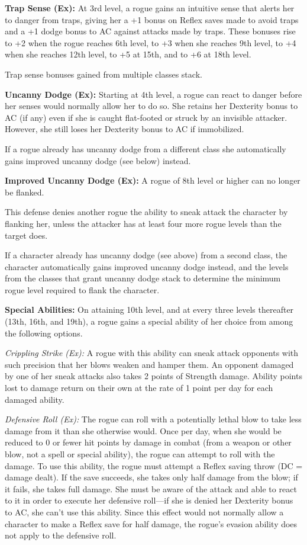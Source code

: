 \documentclass{article}
\begin{document}
\textbf{Trap Sense (Ex):} At 3rd level, a rogue gains an intuitive sense that alerts 
her to danger from traps, giving her a +1 bonus on Reflex saves made to avoid traps 
and a +1 dodge bonus to AC against attacks made by traps. These bonuses rise to 
+2 when the rogue reaches 6th level, to +3 when she reaches 9th level, to +4 when 
she reaches 12th level, to +5 at 15th, and to +6 at 18th level.

Trap sense bonuses gained from multiple classes stack.

\textbf{Uncanny Dodge (Ex):} Starting at 4th level, a rogue can react to danger 
before her senses would normally allow her to do so. She retains her Dexterity 
bonus to AC (if any) even if she is caught flat-footed or struck by an invisible 
attacker. However, she still loses her Dexterity bonus to AC if immobilized.

If a rogue already has uncanny dodge from a different class she automatically gains 
improved uncanny dodge (see below) instead.

\textbf{Improved Uncanny Dodge (Ex):} A rogue of 8th level or higher can no longer 
be flanked.

This defense denies another rogue the ability to sneak attack the character by 
flanking her, unless the attacker has at least four more rogue levels than the 
target does.

If a character already has uncanny dodge (see above) from a second class, the character 
automatically gains improved uncanny dodge instead, and the levels from the classes 
that grant uncanny dodge stack to determine the minimum rogue level required to 
flank the character.

\textbf{Special Abilities:} On attaining 10th level, and at every three levels 
thereafter (13th, 16th, and 19th), a rogue gains a special ability of her choice 
from among the following options.

\textit{Crippling Strike (Ex): }A rogue with this ability can sneak attack opponents 
with such precision that her blows weaken and hamper them. An opponent damaged 
by one of her sneak attacks also takes 2 points of Strength damage. Ability points 
lost to damage return on their own at the rate of 1 point per day for each damaged 
ability.

\textit{Defensive Roll (Ex): }The rogue can roll with a potentially lethal blow 
to take less damage from it than she otherwise would. Once per day, when she would 
be reduced to 0 or fewer hit points by damage in combat (from a weapon or other 
blow, not a spell or special ability), the rogue can attempt to roll with the damage. 
To use this ability, the rogue must attempt a Reflex saving throw (DC = damage 
dealt). If the save succeeds, she takes only half damage from the blow; if it fails, 
she takes full damage. She must be aware of the attack and able to react to it 
in order to execute her defensive roll---if she is denied her Dexterity bonus to 
AC, she can't use this ability. Since this effect would not normally allow a character 
to make a Reflex save for half damage, the rogue's evasion ability does not apply 
to the defensive roll.
\end{document}
